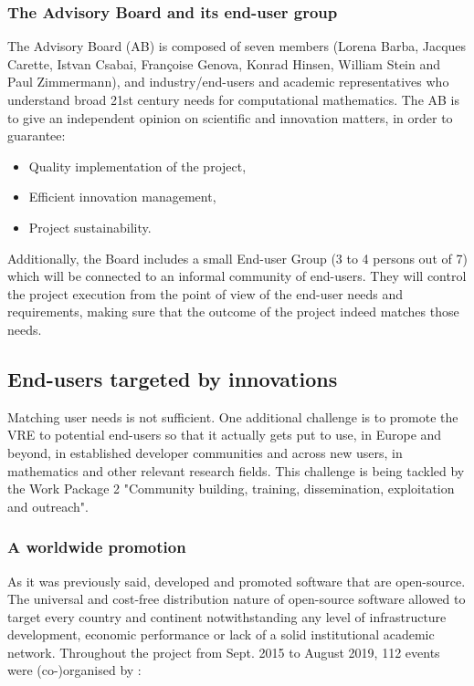 \documentclass{deliverablereport}
\begin{document}
\subsubsection{The Advisory Board and its end-user group}

The Advisory Board (AB) is composed of seven members (Lorena Barba, Jacques Carette,
Istvan Csabai, Françoise Genova, Konrad Hinsen, William Stein and Paul
Zimmermann), and industry/end-users and academic representatives who
understand broad 21st century needs for computational mathematics.
The AB is to give an independent opinion on scientific and innovation
matters, in order to guarantee:

\begin{itemize}
\item Quality implementation of the project,
\item Efficient innovation management,
\item Project sustainability.
\end{itemize}

Additionally, the Board includes a small End-user Group (3 to 4 persons out
of 7) which will be connected to an informal community of
end-users. They will control the project execution from the point of
view of the end-user needs and requirements, making sure that the
outcome of the project indeed matches those needs.

\subsection{End-users targeted by \ODK innovations}

Matching user needs is not sufficient. One additional challenge is to
promote the VRE to potential end-users so that it actually gets put to
use, in Europe and beyond, in established developer communities and
across new users, in mathematics and other relevant research fields. This
challenge is being tackled by the Work Package 2 "Community building,
training, dissemination, exploitation and outreach".


\subsubsection{A worldwide promotion}

As it was previously said, \ODK developed and promoted software that are open-source. The universal and cost-free distribution nature of open-source software allowed \ODK to target every country and continent notwithstanding any level of infrastructure development, economic performance or lack of a solid institutional academic network.
Throughout the project from Sept. 2015 to August 2019, 112 events were
(co-)organised by \ODK:
\end{document}
